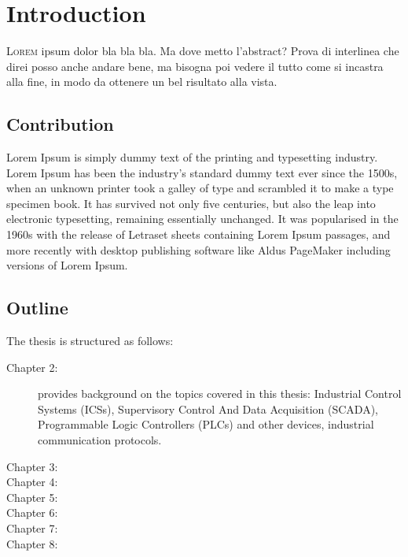 \chapter{Introduction}
\label{intro}

\lettrine[lines=2]{L}{orem} ipsum dolor bla bla bla. Ma dove metto l'abstract? Prova di interlinea che direi posso anche andare bene, ma bisogna poi vedere il tutto come si incastra alla fine, in modo da ottenere un bel risultato alla vista. 

\section{Contribution}
\label{sec:contribution}

Lorem Ipsum is simply dummy text of the printing and typesetting industry. Lorem Ipsum has been the industry's standard dummy text ever since the 1500s, when an unknown printer took a galley of type and scrambled it to make a type specimen book. It has survived not only five centuries, but also the leap into electronic typesetting, remaining essentially unchanged. It was popularised in the 1960s with the release of Letraset sheets containing Lorem Ipsum passages, and more recently with desktop publishing software like Aldus PageMaker including versions of Lorem Ipsum.

\section{Outline}
\label{sec:outline}
The thesis is structured as follows:

\begin{description}
	\item [Chapter 2:] provides background on the topics covered in this thesis: Industrial Control Systems (ICSs), Supervisory Control And Data Acquisition (SCADA), Programmable Logic Controllers (PLCs) and other devices, industrial communication protocols.
	\item [Chapter 3:]
	\item [Chapter 4:]
	\item [Chapter 5:]
	\item [Chapter 6:]
	\item [Chapter 7:]
	\item [Chapter 8:]
\end{description}
